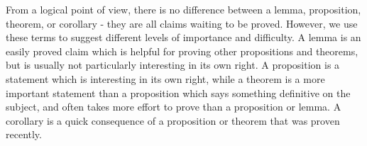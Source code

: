 \begin{note}
  From a logical point of view, there is no difference between a lemma, proposition, theorem, or corollary
  - they are all claims waiting to be proved.
  However, we use these terms to suggest different levels of importance and difficulty.
  A lemma is an easily proved claim which is helpful for proving other propositions and theorems, but is usually not particularly interesting in its own right.
  A proposition is a statement which is interesting in its own right, while a theorem is a more important statement than a proposition which says something definitive on the subject, and often takes more effort to prove than a proposition or lemma.
  A corollary is a quick consequence of a proposition or theorem that was proven recently.
\end{note}

